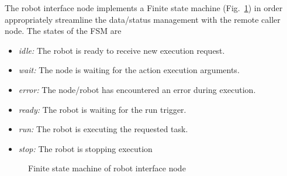The robot interface node implements a Finite state machine (Fig.~\ref{fig:robot_fsm}) in order appropriately streamline the data/status management with the remote caller node. The states of the FSM are
\begin{itemize}[leftmargin={1cm},topsep={0pt},itemsep={0pt},partopsep={0pt},parsep={0pt}] 
\item \emph{idle:} The robot is ready to receive new execution request.
\item \emph{wait:} The node is waiting for the action execution arguments.
\item \emph{error:} The node/robot has encountered an error during execution.
\item \emph{ready:} The robot is waiting for the run trigger.
\item \emph{run:} The robot is executing the requested task.
\item \emph{stop:} The robot is stopping execution
\end{itemize}
\begin{figure}[H]
\centering
{}
\caption[Finite state machine of robot interface node]{Finite state machine of robot interface node}
\label{fig:robot_fsm}
\end{figure}
